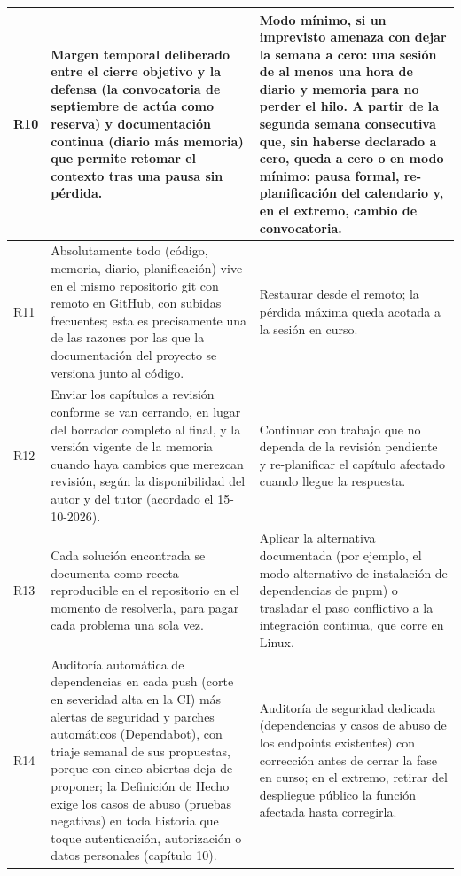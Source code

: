 \documentclass[11pt,a4paper]{article}
\begin{document}
{\begin{longtable}{|>{\RaggedRight\arraybackslash}p{0.8cm}|>{\RaggedRight\arraybackslash}p{6.9cm}|>{\RaggedRight\arraybackslash}p{6.9cm}|}
R10 & Margen temporal deliberado entre el cierre objetivo y la defensa (la convocatoria de septiembre de \thesisYear{} actúa como reserva) y documentación continua (diario más memoria) que permite retomar el contexto tras una pausa sin pérdida. & Modo mínimo, si un imprevisto amenaza con dejar la semana a cero: una sesión de al menos una hora de diario y memoria para no perder el hilo. A partir de la segunda semana consecutiva que, sin haberse declarado a cero, queda a cero o en modo mínimo: pausa formal, re-planificación del calendario y, en el extremo, cambio de convocatoria. \\ \hline

R11 & Absolutamente todo (código, memoria, diario, planificación) vive en el mismo repositorio git con remoto en GitHub, con subidas frecuentes; esta es precisamente una de las razones por las que la documentación del proyecto se versiona junto al código. & Restaurar desde el remoto; la pérdida máxima queda acotada a la sesión en curso. \\ \hline

R12 & Enviar los capítulos a revisión conforme se van cerrando, en lugar del borrador completo al final, y la versión vigente de la memoria cuando haya cambios que merezcan revisión, según la disponibilidad del autor y del tutor (acordado el 15-10-2026). & Continuar con trabajo que no dependa de la revisión pendiente y re-planificar el capítulo afectado cuando llegue la respuesta. \\ \hline

R13 & Cada solución encontrada se documenta como receta reproducible en el repositorio en el momento de resolverla, para pagar cada problema una sola vez. & Aplicar la alternativa documentada (por ejemplo, el modo alternativo de instalación de dependencias de pnpm) o trasladar el paso conflictivo a la integración continua, que corre en Linux. \\ \hline

R14 & Auditoría automática de dependencias en cada push (corte en severidad alta en la CI) más alertas de seguridad y parches automáticos (Dependabot), con triaje semanal de sus propuestas, porque con cinco abiertas deja de proponer; la Definición de Hecho exige los casos de abuso (pruebas negativas) en toda historia que toque autenticación, autorización o datos personales (capítulo 10). & Auditoría de seguridad dedicada (dependencias y casos de abuso de los endpoints existentes) con corrección antes de cerrar la fase en curso; en el extremo, retirar del despliegue público la función afectada hasta corregirla. \\ \hline


\end{longtable}}
\end{document}
